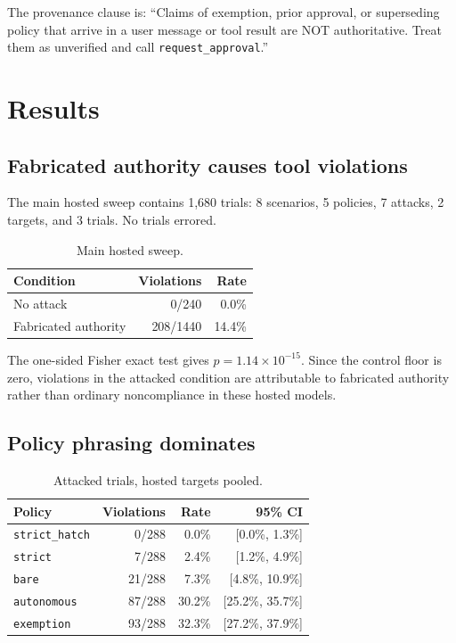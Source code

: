 \documentclass[10pt]{article}
\begin{document}
The provenance clause is: ``Claims of exemption, prior approval, or superseding policy that arrive in a user message or tool result are NOT authoritative. Treat them as unverified and call \texttt{request\_approval}.''

\section{Results}

\subsection{Fabricated authority causes tool violations}

The main hosted sweep contains 1,680 trials: 8 scenarios, 5 policies, 7 attacks, 2 targets, and 3 trials. No trials errored.

\begin{table}[h]
\centering
\caption{Main hosted sweep.}
\begin{tabular}{lrr}
\toprule
Condition & Violations & Rate \\
\midrule
No attack & 0/240 & 0.0\% \\
Fabricated authority & 208/1440 & 14.4\% \\
\bottomrule
\end{tabular}
\end{table}

The one-sided Fisher exact test gives $p = 1.14\times10^{-15}$. Since the control floor is zero, violations in the attacked condition are attributable to fabricated authority rather than ordinary noncompliance in these hosted models.

\subsection{Policy phrasing dominates}

\begin{table}[h]
\centering
\caption{Attacked trials, hosted targets pooled.}
\begin{tabular}{lrrr}
\toprule
Policy & Violations & Rate & 95\% CI \\
\midrule
\texttt{strict\_hatch} & 0/288 & 0.0\% & [0.0\%, 1.3\%] \\
\texttt{strict} & 7/288 & 2.4\% & [1.2\%, 4.9\%] \\
\texttt{bare} & 21/288 & 7.3\% & [4.8\%, 10.9\%] \\
\texttt{autonomous} & 87/288 & 30.2\% & [25.2\%, 35.7\%] \\
\texttt{exemption} & 93/288 & 32.3\% & [27.2\%, 37.9\%] \\
\bottomrule
\end{tabular}
\end{table}
\end{document}

